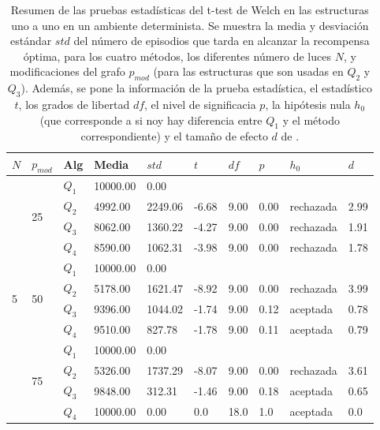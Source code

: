 \clearpage

\begin{table}[]
\centering
\caption{Resumen de las pruebas estadísticas del t-test de Welch en las
estructuras uno a uno en un ambiente determinista. Se muestra la media y desviación estándar $std$ del número 
de episodios que tarda en alcanzar la recompensa óptima, para los cuatro métodos, los diferentes número de luces $N$, y modificaciones del grafo $p_{mod}$ (para las estructuras que son usadas en $Q_2$ y $Q_3$). Además, se pone la información
de la prueba estadística, el estadístico $t$, los grados de libertad $df$, el nivel
de significacia $p$, la hipótesis nula $h_0$ (que corresponde a si noy hay diferencia entre $Q_1$ y el método correspondiente) y el tamaño de efecto $d$ de \citet{cohen2013statistical}.}
\label{tab:one-to-one-pmod-det}
\begin{tabular}{|l|l|l|l|l|l|l|l|l|l|}
\hline
$N$ & $p_{mod}$ & Alg & Media & $std$ & $t$ & $df$ & $p$ & $h_0$ & $d$ \\ \hline
\multirow{12}{*}{5} & \multirow{4}{*}{25} & $Q_1$ & 10000.00 & 0.00 & \multicolumn{5}{l|}{} \\ \cline{3-10} 
 &  & $Q_2$ & 4992.00 & 2249.06 & -6.68 & 9.00 & 0.00 & rechazada & 2.99 \\ \cline{3-10} 
 &  & $Q_3$ & 8062.00 & 1360.22 & -4.27 & 9.00 & 0.00 & rechazada & 1.91 \\ \cline{3-10} 
 &  & $Q_4$ & 8590.00 & 1062.31 & -3.98 & 9.00 & 0.00 & rechazada & 1.78 \\ \cline{2-10} 
 & \multirow{4}{*}{50} & $Q_1$ & 10000.00 & 0.00 & \multicolumn{5}{l|}{} \\ \cline{3-10} 
 &  & $Q_2$ & 5178.00 & 1621.47 & -8.92 & 9.00 & 0.00 & rechazada & 3.99 \\ \cline{3-10} 
 &  & $Q_3$ & 9396.00 & 1044.02 & -1.74 & 9.00 & 0.12 & aceptada & 0.78 \\ \cline{3-10} 
 &  & $Q_4$ & 9510.00 & 827.78 & -1.78 & 9.00 & 0.11 & aceptada & 0.79 \\ \cline{2-10} 
 & \multirow{4}{*}{75} & $Q_1$ & 10000.00 & 0.00 & \multicolumn{5}{l|}{} \\ \cline{3-10} 
 &  & $Q_2$ & 5326.00 & 1737.29 & -8.07 & 9.00 & 0.00 & rechazada & 3.61 \\ \cline{3-10} 
 &  & $Q_3$ & 9848.00 & 312.31 & -1.46 & 9.00 & 0.18 & aceptada & 0.65 \\ \cline{3-10} 
 &  & $Q_4$ & 10000.00 & 0.00 & 0.0 & 18.0 & 1.0 & aceptada & 0.0 \\ \hline

\end{tabular}
\end{table}
